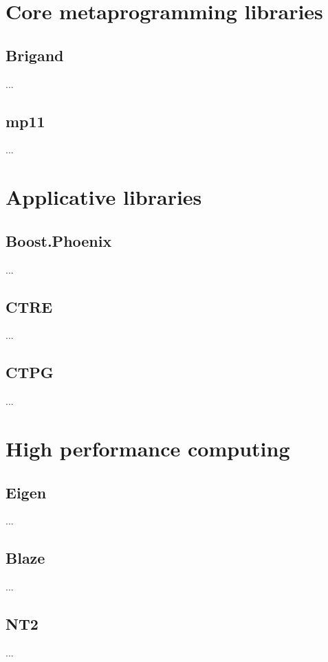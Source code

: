 \documentclass[../../main.tex]{subfiles}
\begin{document}

\section{Core metaprogramming libraries}

\subsection{Brigand} ...

\subsection{mp11} ...

\section{Applicative libraries}

\subsection{Boost.Phoenix} ...

\subsection{CTRE} ...

\subsection{CTPG} ...

\section{High performance computing}

\subsection{Eigen} ...

\subsection{Blaze} ...

\subsection{NT2} ...
\end{document}
